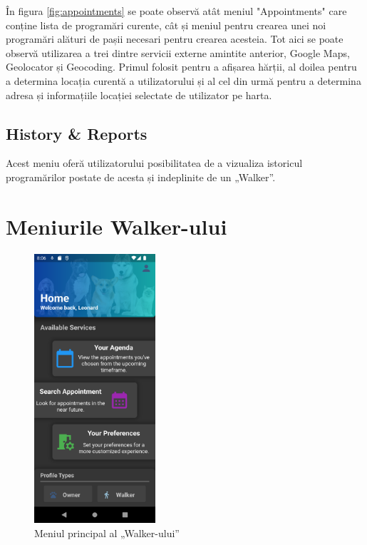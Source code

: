În figura \ref{fig:appointments} se poate observă atât meniul "Appointments" care conține lista de programări curente, cât și meniul pentru crearea unei noi programări alături de pașii necesari pentru crearea acesteia. Tot aici se poate observă utilizarea a trei dintre servicii externe amintite anterior, Google Maps, Geolocator și Geocoding. Primul folosit pentru a afișarea hărții, al doilea pentru a determina locația curentă a utilizatorului și al cel din urmă pentru a determina adresa și informațiile locației selectate de utilizator pe harta.

\subsection{History \& Reports}

Acest meniu oferă utilizatorului posibilitatea de a vizualiza istoricul programărilor postate de acesta și indeplinite de un „Walker”. 

\section{Meniurile Walker-ului}

\begin{figure}
    \centering
    \includegraphics[width=0.4\textwidth]{images/screenshots/main_menu_walker.png}
    \caption{Meniul principal al „Walker-ului”}
    \label{fig:main_menu_walker}
\end{figure}

